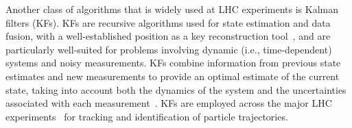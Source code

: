 Another class of algorithms that is widely used at LHC experiments is Kalman filters (KFs). KFs are recursive algorithms used for state estimation and data fusion, with a well-established position as a key reconstruction tool~\cite{kalman-track}, and are particularly well-suited for problems involving dynamic (i.e.,  time-dependent) systems and noisy measurements. KFs combine information from previous state estimates and new measurements to provide an optimal estimate of the current state, taking into account both the dynamics of the system and the uncertainties associated with each measurement~\cite{FRUHWIRTH1987444}. KFs are employed across the major LHC experiments~\cite{Belikov:2003yr,ATLAS:tracking,CMS:tracking,LHCb_Allen_GPU} for tracking and identification of particle trajectories.